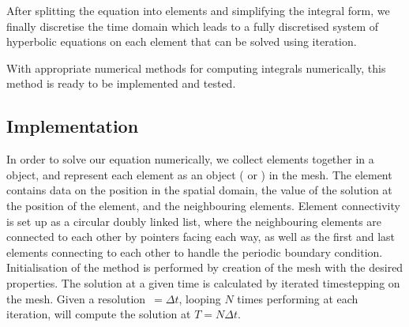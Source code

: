 After splitting the equation into elements and simplifying the integral form, we finally discretise the time domain which leads to a fully discretised system of hyperbolic equations on each element that can be solved using iteration.

With appropriate numerical methods for computing integrals numerically, this method is ready to be implemented and tested.







\subsection{Implementation}
\iffalse
We can choose different basis functions
Different resolutions 
Variable element widths (adaptive mesh refinement) http://www.sciencedirect.com/science/article/pii/0168927494900299
Different time and space discretisations
Solve the problem for higher dimensions
Different numerical flux functions
Try using implicit scheme to improve stability
\fi

In order to solve our equation numerically, we collect elements together in a  object, and represent each element as an object ( or ) in the mesh.
The element contains data on the position in the spatial domain, the value of the solution at the position of the element, and the neighbouring elements.
Element connectivity is set up as a circular doubly linked list, where the neighbouring elements are connected to each other by pointers facing each way, as well as the first and last elements connecting to each other to handle the periodic boundary condition.
Initialisation of the method is performed by creation of the mesh with the desired properties.
The solution at a given time is calculated by iterated timestepping on the mesh.
Given a resolution $\,=\Delta t$, looping $N$ times performing  at each iteration, will compute the solution at $T=N\Delta t$.










